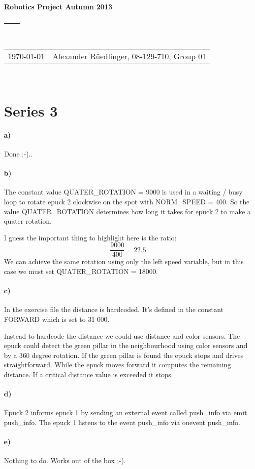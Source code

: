 \documentclass[12pt]{article}
\renewcommand{\title}[1]{\textbf{#1}\\}
\renewcommand{\line}{\begin{tabularx}{\textwidth}{X>{\raggedleft}X}\hline\\\end{tabularx}\\[-0.5cm]}
\newcommand{\leftright}[2]{\begin{tabularx}{\textwidth}{X>{\raggedleft}X}#1%
& #2\\\end{tabularx}\\[-0.5cm]}
\begin{document}
\title{Robotics Project  Autumn 2013}
\line
\leftright{\today}{Alexander Rüedlinger, 08-129-710, Group 01} %
\section*{Series 3}
\paragraph{a)} Done ;-)..

\paragraph{b)}
The constant value QUATER\_ROTATION = 9000 is used in a waiting / busy loop to rotate epuck 2 clockwise on the spot with NORM\_SPEED = 400. So the value QUATER\_ROTATION determines how long it takes for epuck 2 to make a quater rotation.

I guess the important thing to highlight here is the ratio:
\begin{equation}
\frac{9000}{400} = 22.5
\end{equation}
We can achieve the same rotation using only the left speed variable, but in this case we must set QUATER\_ROTATION = 18000.

\paragraph{c)} In the exercise file the distance is hardcoded. It's defined in the constant FORWARD which is set to 31 000. 

Instead to hardcode the distance we could use distance and color sensors. The epuck could detect the green pillar in the neighbourhood using color sensors and by a 360 degree rotation. If the green pillar is found the epuck stops and drives straightforward. While the epuck moves forward it computes the remaining distance. If a critical distance value is exceeded it stops.

\paragraph{d)} Epuck 2 informs epuck 1 by sending an external event called push\_info via emit push\_info. The epuck 1 listens to the event push\_info via onevent push\_info.

\paragraph{e)} Nothing to do. Works out of the box ;-).
\end{document}
